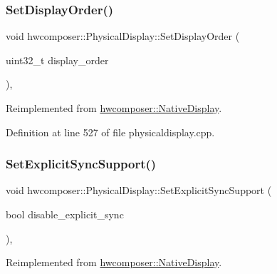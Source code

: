 \subsubsection{\texorpdfstring{Set\+Display\+Order()}{SetDisplayOrder()}}
{\footnotesize\ttfamily void hwcomposer\+::\+Physical\+Display\+::\+Set\+Display\+Order (\begin{DoxyParamCaption}\item[{uint32\+\_\+t}]{display\+\_\+order }\end{DoxyParamCaption})\hspace{0.3cm}{\ttfamily [override]}, {\ttfamily [virtual]}}



Reimplemented from \mbox{\hyperlink{classhwcomposer_1_1NativeDisplay_a86dd66badac1df8de1ca56133249a222}{hwcomposer\+::\+Native\+Display}}.



Definition at line 527 of file physicaldisplay.\+cpp.


\begin{DoxyCode}{0}
\end{DoxyCode}
\mbox{\label{classhwcomposer_1_1PhysicalDisplay_a995cabfaf5aca42854711dacef743373}} 
\subsubsection{\texorpdfstring{Set\+Explicit\+Sync\+Support()}{SetExplicitSyncSupport()}}
{\footnotesize\ttfamily void hwcomposer\+::\+Physical\+Display\+::\+Set\+Explicit\+Sync\+Support (\begin{DoxyParamCaption}\item[{bool}]{disable\+\_\+explicit\+\_\+sync }\end{DoxyParamCaption})\hspace{0.3cm}{\ttfamily [override]}, {\ttfamily [virtual]}}



Reimplemented from \mbox{\hyperlink{classhwcomposer_1_1NativeDisplay_a986975322078e900da95f78be42ad88b}{hwcomposer\+::\+Native\+Display}}.



